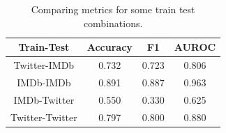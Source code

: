 \begin{table}[h!t]
    \centering
    \caption{Comparing metrics for some train test combinations.}
    \label{tab:versus_metrics}
    \begin{tabular}{c|ccc}
        \hline
        Train-Test & Accuracy & F1 & AUROC \\
        \hline 
        Twitter-IMDb & 0.732 & 0.723 & 0.806 \\ 
        IMDb-IMDb & 0.891 & 0.887 & 0.963 \\ 
        IMDb-Twitter & 0.550 & 0.330 & 0.625 \\ 
        Twitter-Twitter & 0.797 & 0.800 & 0.880 \\ 
        \hline
    \end{tabular}
\end{table}
